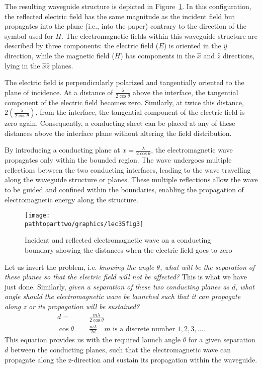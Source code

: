 The resulting waveguide structure is depicted in Figure~\ref{fig:lec35fig3}. In this configuration, the reflected electric field has the same magnitude as the incident field but propagates into the plane (i.e., into the paper) contrary to the direction of the symbol used for $H$. The electromagnetic fields within this waveguide structure are described by three components: the electric field ($E$) is oriented in the $\hat{y}$ direction, while the magnetic field ($H$) has components in the $\hat{x}$ and $\hat{z}$ directions, lying in the $\hat{x}\hat{z}$ planes.

The electric field is perpendicularly polarized and tangentially oriented to the plane of incidence. At a distance of $\frac{\lambda}{2\cos\theta}$ above the interface, the tangential component of the electric field becomes zero. Similarly, at twice this distance, $2\left(\frac{\lambda}{2\cos\theta}\right)$, from the interface, the tangential component of the electric field is zero again. Consequently, a conducting sheet can be placed at any of these distances above the interface plane without altering the field distribution.

By introducing a conducting plane at $x=\frac{\lambda}{2\cos\theta}$, the electromagnetic wave propagates only within the bounded region. The wave undergoes multiple reflections between the two conducting interfaces, leading to the wave travelling along the waveguide structure or planes. These multiple reflections allow the wave to be guided and confined within the boundaries, enabling the propagation of electromagnetic energy along the structure.
\begin{figure}[h]
\centering
\texttt{[image: \\pathtoparttwo/graphics/lec35fig3]}
\caption{Incident and reflected electromagnetic wave on a conducting boundary showing the distances when the electric field goes to zero}
\label{fig:lec35fig3}
\end{figure}

Let us invert the problem, i.e. \emph{knowing the angle $\theta$, what will be the separation of these planes so that the electric field will not be affected?} This is what we have just done. Similarly, \emph{given a separation of these two conducting planes as $d$, what angle should the electromagnetic wave be launched such that it can propagate along z or its propagation will be sustained?} 
\begin{align*}
d =& \frac{m\lambda}{2\cos\theta}\\
\cos\theta =& \frac{m\lambda}{2d}\quad\text{$m$ is a discrete number $1, 2, 3, \ldots$.}
\end{align*}
This equation provides us with the required launch angle $\theta$ for a given separation $d$ between the conducting planes, such that the electromagnetic wave can propagate along the z-direction and sustain its propagation within the waveguide.

